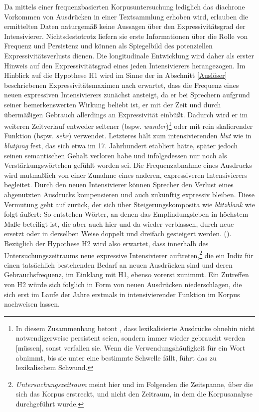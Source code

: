 Da mittels einer frequenzbasierten Korpusuntersuchung lediglich das diachrone Vorkommen von Ausdrücken in einer Textsammlung erhoben wird, erlauben die ermittelten Daten naturgemäß keine Aussagen über den Expressivitätsgrad der Intensivierer. Nichtsdestotrotz liefern sie erste Informationen über die Rolle von Frequenz und Persistenz und können als Spiegelbild des potenziellen Expressivitätsverlusts dienen. Die longitudinale Entwicklung wird daher als erster Hinweis auf den Expressivitätsgrad eines jeden Intensivierers herangezogen. Im Hinblick auf die Hypothese H1 wird im Sinne der in Abschnitt \ref{Auslöser} beschriebenen Expressivitätsmaximen nach \citet[]{Kirschbaum.2002b} erwartet, dass die Frequenz eines neuen expressiven Intensivierers zunächst ansteigt, da er bei Sprechern aufgrund seiner bemerkenswerten Wirkung beliebt ist, er mit der Zeit und durch übermäßigen Gebrauch allerdings an Expressivität einbüßt. Dadurch wird er im weiteren Zeitverlauf entweder seltener (bspw. \textit{wunder})\footnote{In diesem Zusammenhang betont \citet[52]{Gevaudan.2007}, dass lexikalisierte Ausdrücke ohnehin nicht notwendigerweise persistent seien, sondern \glqq{}immer wieder gebraucht werden [müssen], sonst verfallen sie. \textelp{} Wenn die Verwendungshäufigkeit für ein Wort abnimmt, bis sie unter eine bestimmte Schwelle fällt, führt das zu lexikalischem Schwund.\grqq{}} oder mit rein skalierender Funktion (bspw. \textit{sehr}) verwendet. Letzteres hält \citet[12]{Hauschild.1899} zum intensivierenden \textit{blut} wie in \textit{blutjung} fest, das sich etwa im 17. Jahrhundert etabliert hätte, später jedoch seinen semantischen Gehalt verloren habe und infolgedessen \glqq{}nur noch als Verstärkungswörtchen gefühlt\grqq{} worden sei. Die Frequenzabnahme eines Ausdrucks wird mutmaßlich von einer Zunahme eines anderen, expressiveren Intensivierers begleitet. Durch den neuen Intensivierer können Sprecher den Verlust eines abgenutzten Ausdrucks kompensieren und auch zukünftig expressiv bleiben. Diese Vermutung geht auf \citet[]{Baumgarten.1908} zurück, der sich über Steigerungskomposita wie \textit{blitzblank} wie folgt äußert: \glqq{}So entstehen \textelp{} Wörter, an denen das Empfindungsleben in höchstem Maße beteiligt ist, die aber auch hier und da wieder verblassen, durch neue ersetzt oder in derselben Weise doppelt und dreifach gesteigert werden.\grqq{} (\citealt[274]{Baumgarten.1908}). Bezüglich der Hypothese H2 wird also erwartet, dass innerhalb des Untersuchungszeitraums neue expressive Intensivierer auftreten,\footnote{\textit{Untersuchungszeitraum} meint hier und im Folgenden die Zeitspanne, über die sich das Korpus erstreckt, und nicht den Zeitraum, in dem die Korpusanalyse durchgeführt wurde.} die ein Indiz für einen tatsächlich bestehenden Bedarf an neuen Ausdrücken sind und deren Gebrauchsfrequenz, im Einklang mit H1, ebenso vorerst zunimmt. Ein Zutreffen von H2 würde sich folglich in Form von neuen Ausdrücken niederschlagen, die sich erst im Laufe der Jahre erstmals in intensivierender Funktion im Korpus nachweisen lassen.

